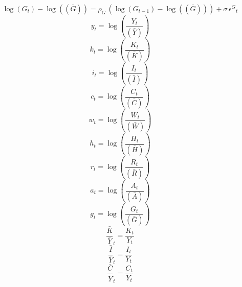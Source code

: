 \begin{dmath}
\log\left({G}_{t}\right)-\log\left((\bar{G})\right)={{\rho_{G}}}\, \left(\log\left({G}_{t-1}\right)-\log\left((\bar{G})\right)\right)+{{\sigma}}\, {{\epsilon^{G}}}_{t}
\end{dmath}
\begin{dmath}
{y}_{t}=\log\left(\frac{{Y}_{t}}{(\bar{Y})}\right)
\end{dmath}
\begin{dmath}
{k}_{t}=\log\left(\frac{{K}_{t}}{(\bar{K})}\right)
\end{dmath}
\begin{dmath}
{i}_{t}=\log\left(\frac{{I}_{t}}{(\bar{I})}\right)
\end{dmath}
\begin{dmath}
{c}_{t}=\log\left(\frac{{C}_{t}}{(\bar{C})}\right)
\end{dmath}
\begin{dmath}
{w}_{t}=\log\left(\frac{{W}_{t}}{(\bar{W})}\right)
\end{dmath}
\begin{dmath}
{h}_{t}=\log\left(\frac{{H}_{t}}{(\bar{H})}\right)
\end{dmath}
\begin{dmath}
{r}_{t}=\log\left(\frac{{R}_{t}}{(\bar{R})}\right)
\end{dmath}
\begin{dmath}
{a}_{t}=\log\left(\frac{{A}_{t}}{(\bar{A})}\right)
\end{dmath}
\begin{dmath}
{g}_{t}=\log\left(\frac{{G}_{t}}{(\bar{G})}\right)
\end{dmath}
\begin{dmath}
{\frac{\bar{K}}{\bar{Y}}}_{t}=\frac{{K}_{t}}{{Y}_{t}}
\end{dmath}
\begin{dmath}
{\frac{\bar{I}}{\bar{Y}}}_{t}=\frac{{I}_{t}}{{Y}_{t}}
\end{dmath}
\begin{dmath}
{\frac{\bar{C}}{\bar{Y}}}_{t}=\frac{{C}_{t}}{{Y}_{t}}
\end{dmath}
